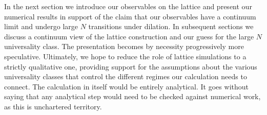 In the next section we introduce our observables on the lattice
and present our numerical results in support of the claim that our
observables have a continuum limit and undergo large $N$
transitions under dilation. In subsequent sections we discuss a
continuum view of the lattice construction and our guess for the
large $N$ universality class. The presentation
becomes by necessity progressively more speculative. Ultimately,
we hope to reduce the role of lattice simulations to a strictly
qualitative one, providing support for the assumptions about the
various universality classes that control the different regimes
our calculation needs to connect.
The calculation in itself would be entirely
analytical. It goes without saying that any analytical step would
need to be checked against numerical work, as this is unchartered
territory.
